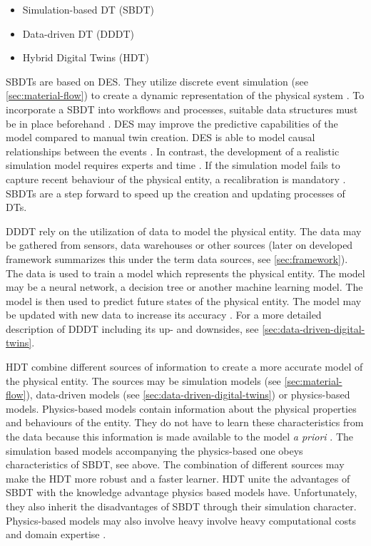 \begin{itemize}
  \item Simulation-based DT (SBDT) \autocite{Lugaresi2021aifac,martinez2018automatic}
  \item Data-driven DT (DDDT) \autocite{he2019data,Friederich2022}
  \item Hybrid Digital Twins (HDT) \autocite{luo2020hybrid,huang2023hybrid}
\end{itemize}


SBDTs \autocite{Lugaresi2021aifac,martinez2018automatic,boschert2016digital} are based on DES. They utilize discrete event simulation (see \autoref{sec:material-flow}) to create a dynamic representation of the physical system \autocite{schluse2016simulation,pantelides2013online}. To incorporate a SBDT into workflows and processes, suitable data structures must be in place beforehand \autocite{boschert2016digital}. DES may improve the predictive capabilities of the model compared to manual twin creation. DES is able to model causal relationships between the events \autocite{francis2021towards}. In contrast, the development of a realistic simulation model requires experts and time \autocite{Charpentier2014}. If the simulation model fails to capture recent behaviour of the physical entity, a recalibration is mandatory \autocite{Friederich2022}. SBDTs are a step forward to speed up the creation and updating processes of DTs.

DDDT rely on the utilization of data to model the physical entity. The data may be gathered from sensors, data warehouses or other sources (later on developed framework summarizes this under the term data sources, see \autoref{sec:framework}). The data is used to train a model which represents the physical entity. The model may be a neural network, a decision tree or another machine learning model. The model is then used to predict future states of the physical entity. The model may be updated with new data to increase its accuracy \autocite{he2019data,Friederich2022}. For a more detailed description of DDDT including its up- and downsides, see \autoref{sec:data-driven-digital-twins}.

HDT combine different sources of information to create a more accurate model of the physical entity. The sources may be simulation models (see \autoref{sec:material-flow}), data-driven models (see \autoref{sec:data-driven-digital-twins}) or physics-based models. Physics-based models contain information about the physical properties and behaviours of the entity. They do not have to learn these characteristics from the data because this information is made available to the model \textit{a priori} \autocite{kapteyn2022data,aivaliotis2019methodology}. The simulation based models accompanying the physics-based one obeys characteristics of SBDT, see above. The combination of different sources may make the HDT more robust and a faster learner. HDT unite the advantages of SBDT with the knowledge advantage physics based models have. Unfortunately, they also inherit the disadvantages of SBDT through their simulation character. Physics-based models may also involve heavy involve heavy computational costs and domain expertise \autocite{kapteyn2022data}.

